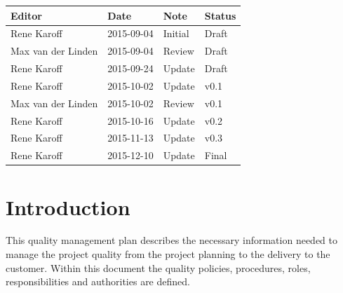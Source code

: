 \documentclass[12pt]{article}
\begin{document}
\begin{table}[htbp]
	\begin{tabularx}{\textwidth}{ X X X X }
		\textbf{Editor} & \textbf{Date} & \textbf{Note} & \textbf{Status} \\ \hline
		Rene Karoff & 2015-09-04 & Initial & Draft \\
		Max van der Linden & 2015-09-04 & Review & Draft\\
		Rene Karoff & 2015-09-24 & Update & Draft\\
		Rene Karoff & 2015-10-02 & Update & v0.1\\
		Max van der Linden & 2015-10-02 & Review & v0.1\\
		Rene Karoff & 2015-10-16 & Update & v0.2\\
		Rene Karoff & 2015-11-13 & Update & v0.3\\
		Rene Karoff & 2015-12-10 & Update & Final\\
	\end{tabularx}
\end{table}
\listoffigures
{}
\listoftables
{}
\pagebreak

\tableofcontents
\clearpage
{}
\section{Introduction}
This quality management plan describes the necessary information needed to manage the project quality from the project planning to the delivery to the customer. Within this document the quality policies, procedures, roles, responsibilities and authorities are defined.
\clearpage
\end{document}
